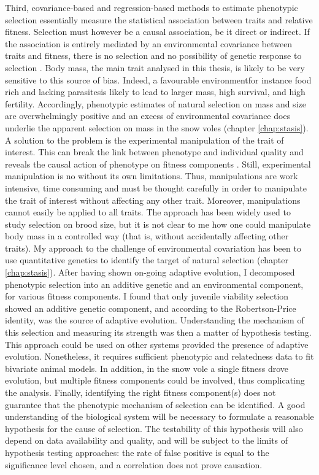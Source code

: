 Third, covariance-based and regression-based methods to estimate phenotypic selection essentially measure the statistical association between traits and relative fitness. Selection must however be a causal association, be it direct or indirect. If the association is entirely mediated by an environmental covariance between traits and fitness, there is no selection and no possibility of genetic response to selection \parencite{Price1989, Rausher1992}. 
Body mass, the main trait analysed in this thesis, is likely to be very sensitive to this source of bias. Indeed, a favourable environment\textemdash for instance food rich and lacking parasites\textemdash is likely to lead to larger mass, high survival, and high fertility. Accordingly, phenotypic estimates of natural selection on mass and size are overwhelmingly positive \parencite{Blanckenhorn2000, Kingsolver2012} and an excess of environmental covariance does underlie the apparent selection on mass in the snow voles (chapter \ref{chap:stasis}).
A solution to the problem is the experimental manipulation of the trait of interest. This can break the link between phenotype and individual quality and reveals the causal action of phenotype on fitness components \parencite[e.g.][]{Tinbergen2004, Tschirren2006}. Still, experimental manipulation is no without its own limitations.
Thus, manipulations are work intensive, time consuming and must be thought carefully in order to manipulate the trait of interest without affecting any other trait. Moreover, manipulations cannot easily be applied to all traits. The approach has been widely used to study selection on brood size, but it is not clear to me how one could manipulate body mass in a controlled way (that is, without accidentally affecting other traits).
My approach to the challenge of environmental covariation has been to use quantitative genetics to identify the target of natural selection (chapter \ref{chap:stasis}). After having shown on-going adaptive evolution, I decomposed phenotypic selection into an additive genetic and an environmental component, for various fitness components. I found that only juvenile viability selection showed an additive genetic component, and according to the Robertson-Price identity, was the source of adaptive evolution. Understanding the mechanism of this selection and measuring its strength was then a matter of hypothesis testing.
This approach could be used on other systems provided the presence of adaptive evolution. Nonetheless, it requires sufficient phenotypic and relatedness data to fit bivariate animal models. In addition, in the snow vole a single fitness drove evolution, but multiple fitness components could be involved, thus complicating the analysis. Finally, identifying the right fitness component(s) does not guarantee that the phenotypic mechanism of selection can be identified. A good understanding of the biological system will be necessary to formulate a reasonable hypothesis for the cause of selection. The testability of this hypothesis will also depend on data availability and quality, and will be subject to the limits of hypothesis testing approaches: the rate of false positive is equal to the significance level chosen, and a correlation does not prove causation.

